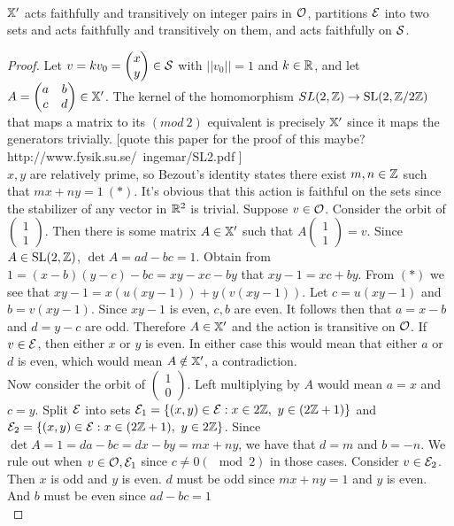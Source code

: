 \documentclass[]{article}
\begin{document}
\newpage
~
\newpage

\begin{lem}
$\mathbb{X}'$ acts faithfully and transitively on integer pairs in $\mathcal{O}$, partitions $\mathcal{E}$ into two sets and acts faithfully and transitively on them, and acts faithfully on $\mathcal{S}$.
\begin{proof}
Let $v=kv_0=\begin{pmatrix}x \\ y\end{pmatrix}\in\mathcal{S}$ with $||v_0||=1$ and $k\in\mathbb{R}$, and let $A=\begin{pmatrix}a & b \\ c & d
\end{pmatrix}\in\mathbb{X}'$. The kernel of the homomorphism $SL(2, \mathbb{Z})\rightarrow \mathrm{SL}(2,\mathbb{Z}/2\mathbb{Z})$ that maps a matrix to its $(mod~2)$ equivalent is precisely $\mathbb{X}'$ since it maps the generators trivially. [quote this paper for the proof of this maybe? http://www.fysik.su.se/~ingemar/SL2.pdf ]\\
$x,y$ are relatively prime, so Bezout's identity states there exist $m,n\in\mathbb{Z}$ such that $mx+ny=1~(*)$. It's obvious that this action is faithful on the sets since the stabilizer of any vector in $\mathbb{R}^2$ is trivial. Suppose $v\in\mathcal{O}$. Consider the orbit of $\begin{pmatrix}1 \\1 \end{pmatrix}$. Then there is some matrix $A\in\mathbb{X}'$ such that $A\begin{pmatrix}1\\1\end{pmatrix}=v$. Since $A\in\mathrm{SL}(2,\mathbb{Z})$, $\det A = ad-bc=1$. Obtain from $1=(x-b)(y-c)-bc=xy-xc-by$ that $xy-1=xc+by$. From $(*)$ we see that $xy-1=x(u(xy-1))+y(v(xy-1))$. Let $c=u(xy-1)$ and $b=v(xy-1)$. Since $xy-1$ is even, $c,b$ are even. It follows then that $a=x-b$ and $d=y-c$ are odd. Therefore $A\in \mathbb{X}'$ and the action is transitive on $\mathcal{O}$. If $v\in\mathcal{E}$, then either $x$ or $y$ is even. In either case this would mean that either $a$ or $d$ is even, which would mean $A\notin\mathbb{X}'$, a contradiction.\\
Now consider the orbit of $\begin{pmatrix}1\\0\end{pmatrix}$. Left multiplying by $A$ would mean $a=x$ and $c=y$. Split $\mathcal{E}$ into sets $\mathcal{E}_1=\{(x,y)\in\mathcal{E} :x\in2\mathbb{Z},~y\in(2\mathbb{Z}+1) \}$ and $\mathcal{E}_2=\{(x,y)\in\mathcal{E}:x\in(2\mathbb{Z}+1),~y\in2\mathbb{Z} \}$. Since $\det A=1=da-bc=dx-by=mx+ny$, we have that $d=m$ and $b=-n$. We rule out when $v\in\mathcal{O},\mathcal{E}_1$ since $c\neq 0 (\mod 2)$ in those cases. Consider $v\in\mathcal{E}_2$. Then $x$ is odd and $y$ is even. $d$ must be odd since $mx+ny=1$ and $y$ is even. And $b$ must be even since $ad-bc=1$\\

\end{proof}
\end{lem}
\end{document}

